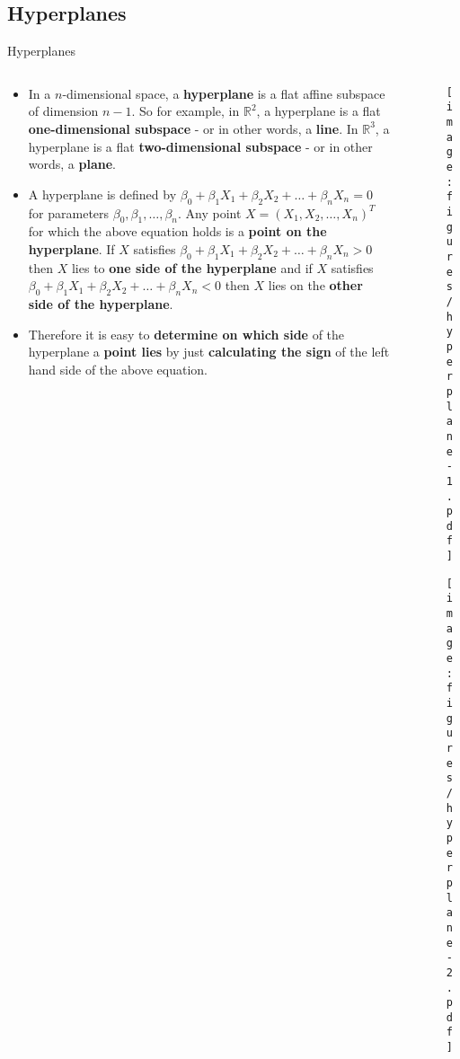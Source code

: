 \documentclass[document.tex]{subfiles}
\begin{document}
    \subsection{Hyperplanes}

    \begin{frame}{Hyperplanes}
        \begin{columns}
            \begin{column}{0.6\textwidth}
                \begin{itemize}
                    \item In a $n$-dimensional space, a \textbf{hyperplane} is a flat affine subspace of dimension $n - 1$. So for example, in $\mathbb{R}^2$, a hyperplane is a flat \textbf{one-dimensional subspace} - or in other words, a \textbf{line}. In $\mathbb{R}^3$, a hyperplane is a flat \textbf{two-dimensional subspace} - or in other words, a \textbf{plane}.
                    \item A hyperplane is defined by $\beta_0 + \beta_1X_1 + \beta_2X_2 + \dots + \beta_nX_n = 0$ for parameters $\beta_0, \beta_1, \dots, \beta_n$. Any point $X = (X_1, X_2, \dots, X_n)^T$ for which the above equation holds is a \textbf{point on the hyperplane}. If $X$ satisfies $\beta_0 + \beta_1X_1 + \beta_2X_2 + \dots + \beta_nX_n > 0$ then $X$ lies to \textbf{one side of the hyperplane} and if $X$ satisfies  $\beta_0 + \beta_1X_1 + \beta_2X_2 + \dots + \beta_nX_n < 0$ then $X$ lies on the \textbf{other side of the hyperplane}.
                    \item  Therefore it is easy to \textbf{determine on which side} of the hyperplane a \textbf{point lies} by just \textbf{calculating the sign} of the left hand side of the above equation.
                \end{itemize}
            \end{column}
            \begin{column}{0.4\textwidth}
                \begin{figure}
                    \label{fig:hyperplane-1}
                    \texttt{[image: figures/hyperplane-1.pdf]}
                \end{figure}
                \begin{figure}
                    \label{fig:hyperplane-2}
                    \texttt{[image: figures/hyperplane-2.pdf]}
                \end{figure}
            \end{column}
        \end{columns}
    \end{frame}
\end{document}

